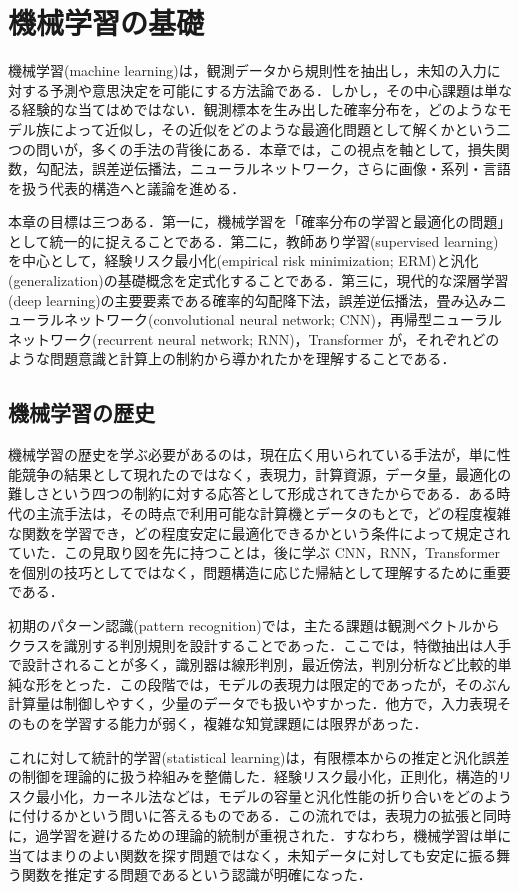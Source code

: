 \section{機械学習の基礎}

機械学習(machine learning)は，観測データから規則性を抽出し，未知の入力に対する予測や意思決定を可能にする方法論である．しかし，その中心課題は単なる経験的な当てはめではない．観測標本を生み出した確率分布を，どのようなモデル族によって近似し，その近似をどのような最適化問題として解くかという二つの問いが，多くの手法の背後にある．本章では，この視点を軸として，損失関数，勾配法，誤差逆伝播法，ニューラルネットワーク，さらに画像・系列・言語を扱う代表的構造へと議論を進める．

本章の目標は三つある．第一に，機械学習を「確率分布の学習と最適化の問題」として統一的に捉えることである．第二に，教師あり学習(supervised learning)を中心として，経験リスク最小化(empirical risk minimization; ERM)と汎化(generalization)の基礎概念を定式化することである．第三に，現代的な深層学習(deep learning)の主要要素である確率的勾配降下法，誤差逆伝播法，畳み込みニューラルネットワーク(convolutional neural network; CNN)，再帰型ニューラルネットワーク(recurrent neural network; RNN)，Transformer が，それぞれどのような問題意識と計算上の制約から導かれたかを理解することである．

\subsection{機械学習の歴史}
機械学習の歴史を学ぶ必要があるのは，現在広く用いられている手法が，単に性能競争の結果として現れたのではなく，表現力，計算資源，データ量，最適化の難しさという四つの制約に対する応答として形成されてきたからである．ある時代の主流手法は，その時点で利用可能な計算機とデータのもとで，どの程度複雑な関数を学習でき，どの程度安定に最適化できるかという条件によって規定されていた．この見取り図を先に持つことは，後に学ぶ CNN，RNN，Transformer を個別の技巧としてではなく，問題構造に応じた帰結として理解するために重要である．

初期のパターン認識(pattern recognition)では，主たる課題は観測ベクトルからクラスを識別する判別規則を設計することであった．ここでは，特徴抽出は人手で設計されることが多く，識別器は線形判別，最近傍法，判別分析など比較的単純な形をとった．この段階では，モデルの表現力は限定的であったが，そのぶん計算量は制御しやすく，少量のデータでも扱いやすかった．他方で，入力表現そのものを学習する能力が弱く，複雑な知覚課題には限界があった．

これに対して統計的学習(statistical learning)は，有限標本からの推定と汎化誤差の制御を理論的に扱う枠組みを整備した．経験リスク最小化，正則化，構造的リスク最小化，カーネル法などは，モデルの容量と汎化性能の折り合いをどのように付けるかという問いに答えるものである．この流れでは，表現力の拡張と同時に，過学習を避けるための理論的統制が重視された．すなわち，機械学習は単に当てはまりのよい関数を探す問題ではなく，未知データに対しても安定に振る舞う関数を推定する問題であるという認識が明確になった．

